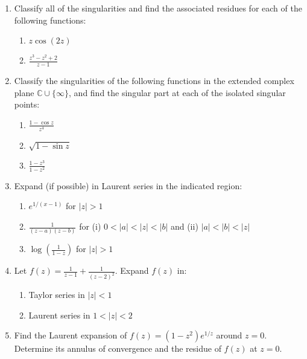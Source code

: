 \documentclass[a4paper,10pt]{article}
\begin{document}
\begin{enumerate}
 	\item Classify all of the singularities and find the associated residues for each of the following functions:
 	
 	\begin{enumerate}
 		\item $z \cos(2z)$
 		
 		\item $\frac{z^3 - z^2 + 2}{z - 1}$
 	\end{enumerate}
 	
 	\item Classify the singularities of the following functions in the extended complex plane $\mathbb{C} \cup \{\infty\}$, and find the singular part at each of the isolated singular points:
 	
 	\begin{enumerate}
 		\item $\frac{1 - \cos z}{z^4}$
 		
 		\item $\sqrt{1 - \sin z}$
 		
 		\item $\frac{1 - z^3}{1 - z^2}$
 	\end{enumerate}
 	
 	\item Expand (if possible) in Laurent series in the indicated region:
 	
 	\begin{enumerate}
 		\item $e^{1/(x - 1)}$ for $|z| > 1$
 		
 		\item $\frac{1}{(z - a)(z - b)}$ for (i) $0 < |a| < |z| < |b|$ and (ii) $|a| < |b| < |z|$
 		
 		\item $\log \left( \frac{1}{1 - z} \right)$ for $|z| > 1$
 	\end{enumerate}
 	
 	\item Let $f(z) = \frac{1}{z - 1} + \frac{1}{(z - 2)^2}$. Expand $f(z)$ in:
 	
 	\begin{enumerate}
 		\item Taylor series in $|z| < 1$
 		
 		\item Laurent series in $1 < |z| < 2$
 	\end{enumerate}
 	
 	\item Find the Laurent expansion of $f(z) = (1 - z^2) e^{1/z}$ around $z = 0$. Determine its annulus of convergence and the residue of $f(z)$ at $z = 0$.
 	

\end{enumerate}
\end{document}
